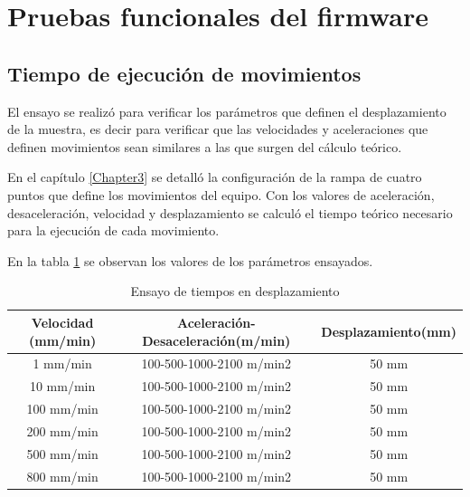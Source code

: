 \section{Pruebas funcionales del firmware}
\subsection{Tiempo de ejecución de movimientos}

El ensayo se realizó para verificar los parámetros que definen el desplazamiento de la muestra, es decir para verificar que las velocidades y aceleraciones que definen movimientos sean similares a las que surgen del cálculo teórico.

En el capítulo \ref{Chapter3} se detalló la configuración de la rampa de cuatro puntos que define los movimientos del equipo. Con los valores de aceleración, desaceleración, velocidad y desplazamiento se calculó el tiempo teórico necesario para la ejecución de cada movimiento.



En la tabla \ref{tab:ensayo_comandos} se observan los valores de los parámetros ensayados.

\begin{table}[h!]
	\centering
	\caption[Ensayo de tiempo en desplazamientos]{Ensayo de tiempos en desplazamiento}
	\begin{tabular}{c c c }    
		\toprule
		\textbf{Velocidad (mm/min)}     & \textbf{Aceleración-Desaceleración(m/min)} & \textbf{Desplazamiento(mm)} \\
		\midrule
		1  mm/min	 & 	   100-500-1000-2100 m/min2     & 	50 mm 			 	\\		
		10  mm/min   & 	   100-500-1000-2100 m/min2 	& 	50 mm				\\
		100  mm/min  & 	   100-500-1000-2100 m/min2	    & 	50 mm 				\\
		200  mm/min	 & 	   100-500-1000-2100 m/min2	    & 	50 mm 			\\
		500  mm/min	 & 	   100-500-1000-2100 m/min2     & 	50 mm					\\
		800  mm/min	 & 	   100-500-1000-2100 m/min2     & 	50 mm					\\
		\bottomrule
		\hline
	\end{tabular}
	\label{tab:ensayo_comandos}
\end{table}

